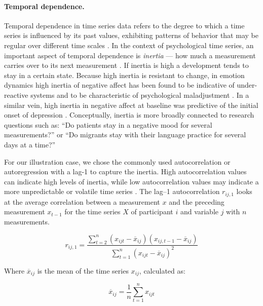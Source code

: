 \paragraph{Temporal dependence.}

Temporal dependence in time series data refers to the degree to which a
time series is influenced by its past values, exhibiting patterns of
behavior that may be regular over different time scales
\citep{dmello2021}. In the context of psychological time series, an
important aspect of temporal dependence is \textit{inertia} --- how much
a measurement carries over to its next measurement
\citep{kuppens2010, suls1998}. If inertia is high a development tends to
stay in a certain state. Because high inertia is resistant to change, in
emotion dynamics high inertia of negative affect has been found to be
indicative of under-reactive systems and to be characteristic of
psychological maladjustment \citep{kuppens2010}. In a similar vein, high
inertia in negative affect at baseline was predictive of the initial
onset of depression \citep{kuppens2012}. Conceptually, inertia is more
broadly connected to research questions such as: ``Do patients stay in a
negative mood for several measurements?'' or ``Do migrants stay with
their language practice for several days at a time?''

For our illustration case, we chose the commonly used autocorrelation or
autoregression with a lag-1 to capture the inertia. High autocorrelation
values can indicate high levels of inertia, while low autocorrelation
values may indicate a more unpredictable or volatile time series
\citep{dejonckheere2019}. The lag--1 autocorrelation \(r_{ij,1}\) looks
at the average correlation between a measurement \(x\) and the preceding
measurement \(x_{t-1}\) for the time series \(X\) of participant \(i\)
and variable \(j\) with \(n\) measurements.

\begin{equation} \label{eq:ar}
  r_{ij,1} = \frac{\sum_{t=2}^{n}(x_{ijt}-\overline{x}_{ij})(x_{ij,t-1}-\overline{x}_{ij})}{\sum_{t=1}^{n}(x_{ijt}-\overline{x}_{ij})^2}
\end{equation}

Where \(\overline{x}_{ij}\) is the mean of the time series \(x_{ij}\),
calculated as:

\begin{equation} \label{eq:mean_for_ar1}
  \overline{x}_{ij} = \frac{1}{n} \sum_{t=1}^{n} x_{ijt}
\end{equation}

